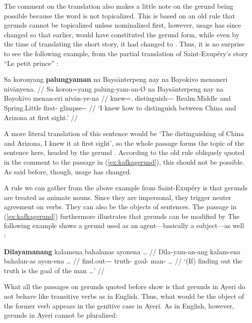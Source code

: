 The comment on the translation also makes a little note on the gerund being
possible because the word is not topicalized. This is based on an old rule that
gerunds cannot be topicalized unless nominalized first, however, usage has
since changed so that earlier,  would have constituted
the gerund form, while even by the time of translating the short story, it had
changed to . Thus, it is no surprise to see the
following example, from the partial translation of Saint-Exupéry's story
\enquote{Le petit prince} \citep[3, 13]{benung:petitprince}:

\ex\label{ex:exuperygerund}\begingl
	\gla Sa koronyang \textbf{palungyaman} na Baysānterpeng nay na Bayokivo 
		menaneri nivānyena. //
	\glb Sa koron=yang palung-yam-an-Ø na Baysānterpeng nay na 
		Bayokivo menan-eri nivān-ye-na //
	\glc \PatT{} knew=\Fsg{}.\Aarg{} 
		distinguish-\Ptcp{}-\Nmlz{}-\Top{} \Gen{} Realm.Middle 
		and \Gen{} Spring.Little first-\Ins{} glimpse-\Pl{}-\Gen{} //
	\glft `I knew how to distinguish between China and Arizona at first 
		sight.' //
\endgl\xe

A more literal translation of this sentence would be `The distinguishing of
China and Arizona, I knew it at first sight', so the whole passage
 forms the topic of the
sentence here, headed by the gerund
. According to the old rule
obliquely quoted in the comment to the passage in (\ref{ex:kafkagerund}), this
should not be possible. As said before, though, usage has changed.

A rule we can gather from the above example from Saint-Exupéry is that gerunds 
are treated as animate nouns. Since they are impersonal, they trigger neuter 
agreement on verbs. They can also be the objects of sentences. The passage in 
(\ref{ex:kafkagerund}) furthermore illustrates that gerunds can be modified by 
The following example shows a gerund used as an agent---basically a 
subject---as well \citep{benung:scientificmethod}:

\ex\label{ex:scimethgerund}\begingl
	\gla \textbf{Dilayamanang} kalamena bahalanas ayonena … //
	\glb Dila-yam-an-ang kalam-ena bahalan-as ayon-ena … //
	\glc find.out-\Ptcp{}-\Nmlz{}-\Aarg{} truth-\Gen{} goal-\Parg{} 
		man-\Gen{} … //
	\glft `(If) finding out the truth is the goal of the man …' //
\endgl\xe

What all the passages on gerunds quoted before show is that gerunds in Ayeri do
not behave like transitive verbs as in English. Thus, what would be the object
of the former verb appears in the genitive case in Ayeri. As in English,
however, gerunds in Ayeri cannot be pluralized:

